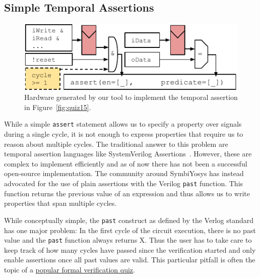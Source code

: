 \documentclass[conference]{IEEEtran}
\newcommand{\code}[1]{{\small{\texttt{#1}}}}
\begin{document}
\subsection{Simple Temporal Assertions}\label{sec:past}

\begin{figure}
  \centering
  \includegraphics{woset_safe_past.pdf}
  \caption{Hardware generated by our tool to implement the temporal assertion in Figure~\ref{fig:quiz15}.}
  \label{fig:past}
\end{figure}


While a simple \code{assert} statement allows us to specify a property over signals during a single
cycle, it is not enough to express properties that require us to reason about multiple cycles.
The traditional answer to this problem are temporal assertion languages like SystemVerilog Assertions~\cite{SystemVerilog}.
However, these are complex to implement efficiently and as of now there has not been a successful open-source implementation.
The community around SymbiYosys has instead advocated for the use of plain assertions with the Verilog \code{past}
function. This function returns the previous value of an expression and thus allows us to write properties that span multiple cycles.

While conceptually simple, the \code{past} construct as defined by the Verlog standard has one major problem:
In the first cycle of the circuit execution, there is no past value and the \code{past} function always returns X.
Thus the user has to take care to keep track of how many cycles have passed since the verification started and only enable assertions
once all past values are valid.
This particular pitfall is often the topic of a \href{http://zipcpu.com/quiz/2019/11/16/quiz07.html}{popular formal verification quiz}.
\end{document}
